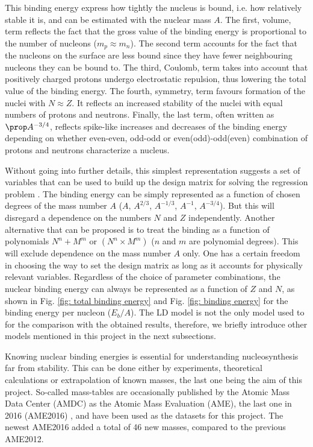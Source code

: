 \documentclass[numberedappendix, twocolappendix]{emulateapj}
\begin{document}
This binding energy express how tightly the nucleus is bound, i.e. how relatively stable it is, and can be estimated with the nuclear mass $A$.  The first, volume, term reflects the fact that the gross value of the binding energy is proportional to the number of nucleons ($m_p\approx m_n$). The second term accounts for the fact that the nucleons on the surface are less bound since they have fewer neighbouring nucleons they can be bound to. The third, Coulomb, term takes into account that positively charged protons undergo electrostatic repulsion, thus lowering the total value of the binding energy. The fourth, symmetry, term favours formation of the nuclei with $N\approx Z$. It reflects an increased stability of the nuclei with equal numbers of protons and neutrons. Finally, the last term, often written as $\prop A^{-3/4}$, reflects spike-like increases and decreases of the binding energy depending on whether even-even, odd-odd or even(odd)-odd(even) combination of protons and neutrons characterize a nucleus. 

Without going into further details, this simplest representation suggests a set of variables that can be used to build up the design matrix for solving the regression problem \cite{proj1_1, proj1_2}. The binding energy can be simply represented as a function of chosen degrees of the mass number $A$ ($A$, $A^{2/3}$, $A^{-1/3}$, $A^{-1}$, $A^{-3/4}$). But this will disregard a dependence on the numbers $N$ and $Z$ independently. Another alternative that can be proposed is to treat the binding as a function of polynomials $N^n+M^m$ or $(N^n\times M^m)$ ($n$ and $m$ are polynomial degrees). This will exclude dependence on the mass number $A$ only. One has a certain freedom in choosing the way to set the design matrix as long as it accounts for physically relevant variables. Regardless of the choice of parameter combinations, the nuclear binding energy can always be represented as a function of $Z$ and $N$, as shown in Fig. \ref{fig: total binding energy} and Fig. \ref{fig: binding energy} for the binding energy per nucleon ($E_b/A$). The LD model is not the only model used to for the comparison with the obtained results, therefore, we briefly introduce other models mentioned in this project in the next subsections.

Knowing nuclear binding energies is essential for understanding nucleosynthesis far from stability. This can be done either by experiments, theoretical calculations or extrapolation of known masses, the last one being the aim of this project. So-called mass-tables are occasionally published by the Atomic Mass Data Center (AMDC) as the Atomic Mass Evaluation (AME), the last one  in 2016 (AME2016) \cite{ame16}, and have been used as the datasets for this project. The newest AME2016 added a total of 46 new masses, compared to the previous AME2012. 
\end{document}
